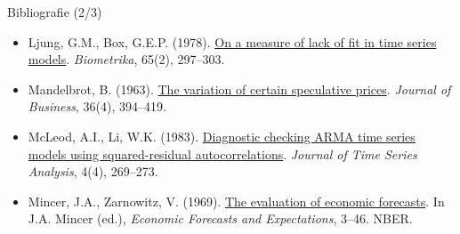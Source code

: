 \begin{frame}{Bibliografie (2/3)}
\begin{itemize}
    \item Ljung, G.M., Box, G.E.P. (1978). \href{https://doi.org/10.1093/biomet/65.2.297}{On a measure of lack of fit in time series models}. \textit{Biometrika}, 65(2), 297--303.
    \item Mandelbrot, B. (1963). \href{https://doi.org/10.1086/294632}{The variation of certain speculative prices}. \textit{Journal of Business}, 36(4), 394--419.
    \item McLeod, A.I., Li, W.K. (1983). \href{https://doi.org/10.1111/j.1467-9892.1983.tb00373.x}{Diagnostic checking ARMA time series models using squared-residual autocorrelations}. \textit{Journal of Time Series Analysis}, 4(4), 269--273.
    \item Mincer, J.A., Zarnowitz, V. (1969). \href{https://www.nber.org/books-and-chapters/economic-forecasts-and-expectations-analysis-forecasting-behavior-and-performance/evaluation-economic-forecasts}{The evaluation of economic forecasts}. In J.A. Mincer (ed.), \textit{Economic Forecasts and Expectations}, 3--46. NBER.
\end{itemize}
\end{frame}

